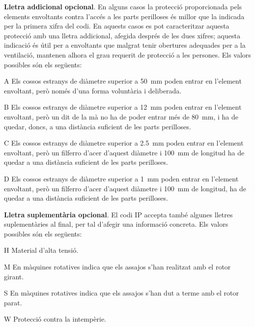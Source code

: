 \textbf{Lletra addicional opcional}. En alguns casos la protecció
proporcionada pels elements envoltants contra l'accés a les parts
perilloses és millor que la indicada per la primera xifra del codi.
En aquests casos es pot caracteritzar aquesta protecció amb una
lletra addicional, afegida després de les dues xifres; aquesta indicació és útil per a  envoltants que malgrat tenir obertures adequades per a la ventilació,  mantenen alhora el
grau requerit de protecció a les persones. Els valors possibles són
els següents:
\begin{list}{}
   {\setlength{\labelwidth}{10mm} \setlength{\leftmargin}{15mm} \setlength{\labelsep}{5mm}}
   \item[A] Els  cossos estranys de diàmetre superior a
   \qty{50}{mm}    poden entrar en l'element envoltant, però només d'una forma voluntària i deliberada.
   \item[B] Els  cossos estranys de diàmetre superior a \qty{12}{mm}
    poden entrar en l'element envoltant, però un dit de la mà no ha de poder entrar més de \qty{80}{mm}, i
    ha de quedar, doncs, a una distància    suficient de les parts perilloses.
   \item[C] Els  cossos estranys de diàmetre superior a \qty{2,5}{mm}
   poden entrar en l'element envoltant, però un filferro d'acer d'aquest diàmetre i \qty{100}{mm}
   de longitud ha de quedar a una distància suficient de les parts perilloses.
   \item[D] Els  cossos estranys de diàmetre superior a \qty{1}{mm}
   poden entrar en l'element envoltant, però un filferro d'acer d'aquest diàmetre i \qty{100}{mm}
   de longitud, ha de quedar a una distància suficient de les parts perilloses.
\end{list}

\textbf{Lletra suplementària opcional}. El codi IP accepta també algunes
lletres suplementàries al final, per tal d'afegir una informació concreta. Els valors
possibles són els següents:
\begin{list}{}
   {\setlength{\labelwidth}{10mm} \setlength{\leftmargin}{15mm} \setlength{\labelsep}{5mm}}
   \item[H] Material d'alta tensió.
   \item[M] En màquines rotatives indica que els assajos s'han realitzat amb el
    rotor girant.
   \item[S] En màquines rotatives indica que els assajos s'han dut a terme amb el
    rotor parat.
   \item[W] Protecció contra la intempèrie.
\end{list}


